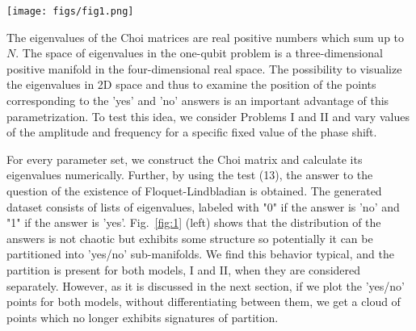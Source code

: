 \documentclass[%
 aip,
 floatfix,
 amsmath,amssymb,
 reprint,%
]{revtex4-1}
\begin{document}
\begin{figure*}[h]
\texttt{[image: figs/fig1.png]}
\caption{Distribution of 'yes' (orange and red dots) and 'no' (blue and green dots) answers in the space of the three largest eigenvalues of the Choi matrices of the Floquet maps. Left: distribution for Problem~I, Eq.~(15), for phase shift of $\pi/2$. Right: Distributions for Problem~I, Eq.~(15), and Problem~II, Eq.~(16), plotted together. Classification is expected to be more complicated in this case because the separability cannot be  detectable visually, in  contrast to the distribution for Problem I alone (left panel).} \label{fig:1}
\end{figure*}

The eigenvalues of the Choi matrices are real positive numbers which sum up to $N$. The space of eigenvalues in the one-qubit problem is a three-dimensional positive manifold in the four-dimensional real space. The possibility to visualize the eigenvalues in 2D space and thus to examine the position of the points corresponding to the 'yes' and 'no' answers is an important advantage of this parametrization. To test  this idea, we consider Problems I and II and vary values of the amplitude and frequency for a specific fixed value of the phase shift. %

For every parameter set, we construct the Choi matrix and calculate its eigenvalues numerically. Further, by using the test (13), the answer to the question of the existence of Floquet-Lindbladian is obtained. The generated dataset consists of lists of eigenvalues, labeled with "0" if the answer is 'no' and "1" if the answer is 'yes'. Fig.~\ref{fig:1} (left) shows that the distribution of the answers is not chaotic but exhibits some structure so potentially it can be partitioned into 'yes/no' sub-manifolds. We find this behavior typical, and the partition is present for both models, I and II, when they are considered separately. 
However, as it is discussed in the next section, if we plot the 'yes/no' points for both models, without differentiating between them, we get a cloud of points which no longer exhibits signatures of partition. 
\end{document}
